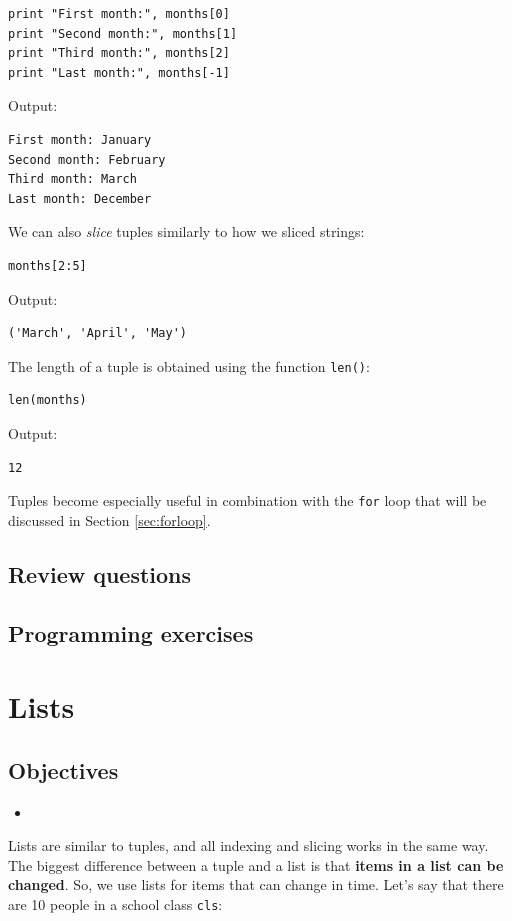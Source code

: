 \begin{verbatim}
print "First month:", months[0]
print "Second month:", months[1]
print "Third month:", months[2]
print "Last month:", months[-1]
\end{verbatim}
Output:

\begin{verbatim}
First month: January
Second month: February
Third month: March
Last month: December
\end{verbatim}
We can also {\em slice} tuples similarly to how we sliced strings:

\begin{verbatim}
months[2:5]
\end{verbatim}
Output:

\begin{verbatim}
('March', 'April', 'May')
\end{verbatim}
The length of a tuple is obtained using the function {\tt len()}:

\begin{verbatim}
len(months)
\end{verbatim}
Output:

\begin{verbatim}
12
\end{verbatim}
Tuples become especially useful in combination with the {\tt for}
loop that will be discussed in Section \ref{sec:forloop}. 

\subsection{Review questions}

\subsection{Programming exercises}


\section{Lists}

\subsection{Objectives}

\begin{itemize}
\item
\end{itemize}

\noindent
Lists are similar to tuples, and all indexing and slicing works in the same way. 
The biggest difference between a tuple 
and a list is that {\bf items in a list can be changed}. So, we use
lists for items that can change in time. Let's say that there are 
10 people in a school class {\tt cls}:

